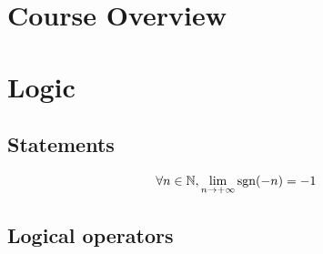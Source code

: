 \documentclass{lec}
\begin{document}
\section{Course Overview}

	\lipsum[1]
	\section{Logic}
	
	\lipsum[2]

	\subsection{Statements}
	\begin{align*}
		\forall n \in \mathbb{N}, \lim\limits_{n\to +\infty} \operatorname{sgn}(-n) = -1
	\end{align*}

	\subsection{Logical operators}
	\lipsum[3]
\end{document}
